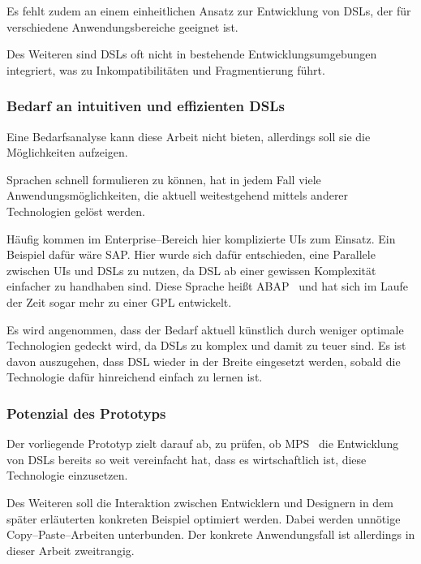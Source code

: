 Es fehlt zudem an einem einheitlichen Ansatz zur Entwicklung von \acp{DSL}, der für verschiedene Anwendungsbereiche geeignet ist. %

Des Weiteren sind \acp{DSL} oft nicht in bestehende Entwicklungsumgebungen integriert, was zu Inkompatibilitäten und Fragmentierung führt.

\subsubsection{Bedarf an intuitiven und effizienten \aclp{DSL}}
Eine Bedarfsanalyse kann diese Arbeit nicht bieten, allerdings soll sie die Möglichkeiten aufzeigen.

Sprachen schnell formulieren zu können, hat in jedem Fall viele Anwendungsmöglichkeiten, die aktuell weitestgehend mittels anderer Technologien gelöst werden.

Häufig kommen im Enterprise--Bereich hier komplizierte \acp{UI} zum Einsatz.
Ein Beispiel dafür wäre SAP\@.
Hier wurde sich dafür entschieden, eine Parallele zwischen \acp{UI} und \acp{DSL} zu nutzen, da \ac{DSL} ab einer gewissen Komplexität einfacher zu handhaben sind.
Diese Sprache heißt ABAP~\autocite{sap-se-no-date} und hat sich im Laufe der Zeit sogar mehr zu einer \ac{GPL} entwickelt.

Es wird angenommen, dass der Bedarf aktuell künstlich durch weniger optimale Technologien gedeckt wird, da \acp{DSL} zu komplex und damit zu teuer sind.
Es ist davon auszugehen, dass \ac{DSL} wieder in der Breite eingesetzt werden, sobald die Technologie dafür hinreichend einfach zu lernen ist.

\subsubsection{Potenzial des Prototyps}
Der vorliegende Prototyp zielt darauf ab, zu prüfen, ob \ac{MPS}~\autocite{jetbrains-sro-2021} die Entwicklung von \acp{DSL} bereits so weit vereinfacht hat, dass es wirtschaftlich ist, diese Technologie einzusetzen.

Des Weiteren soll die Interaktion zwischen Entwicklern und Designern in dem später erläuterten konkreten Beispiel optimiert werden.
Dabei werden unnötige Copy--Paste--Arbeiten unterbunden.
Der konkrete Anwendungsfall ist allerdings in dieser Arbeit zweitrangig.


